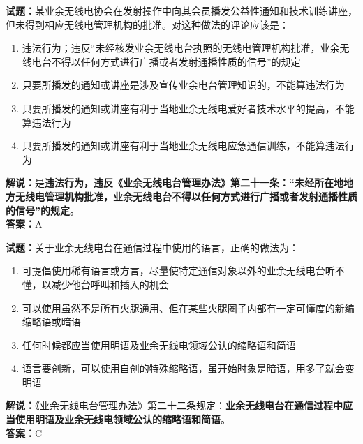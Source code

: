 \documentclass{ctexbook}
\begin{document}
\bigskip

\noindent\textbf{试题：}某业余无线电协会在发射操作中向其会员播发公益性通知和技术训练讲座，但未得到相应无线电管理机构的批准。对这种做法的评论应该是：
\begin{enumerate}[leftmargin=3em]
  \item 违法行为；违反“未经核发业余无线电台执照的无线电管理机构批准，业余无线电台不得以任何方式进行广播或者发射通播性质的信号”的规定
  \item 只要所播发的通知或讲座是涉及宣传业余电台管理知识的，不能算违法行为
  \item 只要所播发的通知或讲座有利于当地业余无线电爱好者技术水平的提高，不能算违法行为
  \item 只要所播发的通知或讲座有利于当地业余无线电应急通信训练，不能算违法行为
\end{enumerate}
\noindent\textbf{解说：}是\textbf{违法行为，违反《业余无线电台管理办法》第二十一条：“未经所在地地方无线电管理机构批准，业余无线电台不得以任何方式进行广播或者发射通播性质的信号”的规定}。\\\noindent\textbf{答案：}A

\bigskip

\noindent\textbf{试题：}关于业余无线电台在通信过程中使用的语言，正确的做法为：
\begin{enumerate}[leftmargin=3em]
  \item 可提倡使用稀有语言或方言，尽量使特定通信对象以外的业余无线电台听不懂，以减少他台呼叫和插入的机会
  \item 可以使用虽然不是所有火腿通用、但在某些火腿圈子内部有一定可懂度的新编缩略语或暗语
  \item 任何时候都应当使用明语及业余无线电领域公认的缩略语和简语
  \item 语言要创新，可以使用自创的特殊缩略语，虽开始时象是暗语，用多了就会变明语
\end{enumerate}
\noindent\textbf{解说：}《业余无线电台管理办法》第二十二条规定：\textbf{业余无线电台在通信过程中应当使用明语及业余无线电领域公认的缩略语和简语}。\\\noindent\textbf{答案：}C

\bigskip
\end{document}
